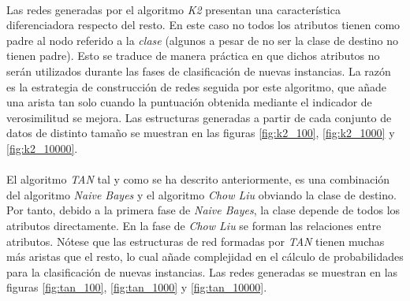 \documentclass{article}
\begin{document}
			\paragraph{}
			Las redes generadas por el algoritmo \emph{K2} presentan una característica diferenciadora respecto del resto. En este caso no todos los atributos tienen como padre al nodo referido a la \emph{clase} (algunos a pesar de no ser la clase de destino no tienen padre). Esto se traduce de manera práctica en que dichos atributos no serán utilizados durante las fases de clasificación de nuevas instancias. La razón es la estrategia de construcción de redes seguida por este algoritmo, que añade una arista tan solo cuando la puntuación obtenida mediante el indicador de verosimilitud se mejora. Las estructuras generadas a partir de cada conjunto de datos de distinto tamaño se muestran en las figuras \ref{fig:k2_100}, \ref{fig:k2_1000} y \ref{fig:k2_10000}.

			\paragraph{}
			El algoritmo \emph{TAN} tal y como se ha descrito anteriormente, es una combinación del algoritmo \emph{Naive Bayes} y el algoritmo \emph{Chow Liu} obviando la clase de destino. Por tanto, debido a la primera fase de \emph{Naive Bayes}, la clase depende de todos los atributos directamente. En la fase de \emph{Chow Liu} se forman las relaciones entre atributos. Nótese que las estructuras de red formadas por \emph{TAN} tienen muchas más aristas que el resto, lo cual añade complejidad en el cálculo de probabilidades para la clasificación de nuevas instancias. Las redes generadas se muestran en las figuras  \ref{fig:tan_100}, \ref{fig:tan_1000} y \ref{fig:tan_10000}.
\end{document}
